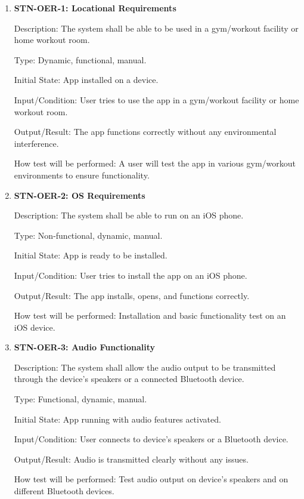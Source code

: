 \documentclass[12pt, titlepage]{article}
\begin{document}
    \begin{enumerate}

        \item {\textbf{STN-OER-1: Locational Requirements}}

        Description:  The system shall be able to be used in a gym/workout facility or home workout room.

        Type: Dynamic, functional, manual.

        Initial State: App installed on a device.

        Input/Condition: User tries to use the app in a gym/workout facility or home workout room.

        Output/Result: The app functions correctly without any environmental interference.

        How test will be performed: A user will test the app in various gym/workout environments to ensure functionality.


        \item{\textbf{STN-OER-2: OS Requirements}}

        Description: The system shall be able to run on an iOS phone.

        Type: Non-functional, dynamic, manual.

        Initial State: App is ready to be installed.

        Input/Condition: User tries to install the app on an iOS phone.

        Output/Result: The app installs, opens, and functions correctly.

        How test will be performed: Installation and basic functionality test on an iOS device.


        \item{\textbf{STN-OER-3: Audio Functionality}}

        Description: The system shall allow the audio output to be transmitted through the device’s speakers or a connected Bluetooth device.

        Type: Functional, dynamic, manual.

        Initial State: App running with audio features activated.

        Input/Condition: User connects to device’s speakers or a Bluetooth device.

        Output/Result: Audio is transmitted clearly without any issues.

        How test will be performed: Test audio output on device’s speakers and on different Bluetooth devices.



\end{enumerate}
\end{document}
